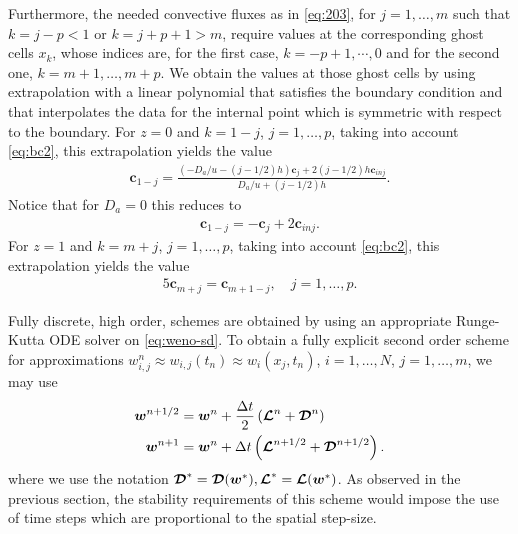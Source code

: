 \documentclass[preprint]{elsarticle}
\theoremstyle{definition}
\newcommand{\bw}{\boldsymbol w}
\newcommand{\bc}{\boldsymbol c}
\def\boc#1{\boldsymbol{{\cal #1}}}
\def\mD{\boc{D}}
\begin{document}
Furthermore, the needed convective fluxes as in \eqref{eq:203}, for
$j=1,\dots,m$ such that $k=j-p<1$ or $k=j+p+1 > m$, require values at the
corresponding ghost cells $x_k$, whose indices are, for the first case,
$k=-p+1,\cdots,0$ 
and for the second one, $k=m+1,\dots,m+p$. We  obtain the values at
those ghost cells by using  extrapolation with a linear polynomial
that satisfies the boundary condition and that interpolates the data 
for the internal point which is symmetric with respect to the
boundary. For $z=0$ and $k=1-j$, $j=1,\dots,p$, taking into account
\eqref{eq:bc2}, this extrapolation yields the value
\begin{align*}
  \bc_{1-j}=\frac{(-D_a/u-(j-1/2)h)\bc_j+2(j-1/2)h \bc_{inj}
  }{D_a/u+(j-1/2)h}.
\end{align*}
Notice that for $D_a=0$ this reduces to 
\begin{align*}
  \bc_{1-j}=-\bc_j+2\bc_{inj}.
\end{align*}
For $z=1$ and $k=m+j$, $j=1,\dots,p$, taking into account
\eqref{eq:bc2}, this extrapolation yields the value
\begin{align*}5\label{eq:bc22}
  \bc_{m+j}= \bc_{m+1-j},\quad  j=1,\dots,p.
\end{align*}



Fully discrete, high order, schemes are obtained by using an
appropriate Runge-Kutta ODE solver on \eqref{eq:weno-sd}.  To obtain
a fully explicit second order  scheme for approximations
$w^{n}_{i,j}\approx w_{i,j}(t_n)\approx w_i(x_j, t_n)$,
  $i=1,\dots,N$, $j=1,\dots,m$, we may use 
  \begin{equation} \label{eq:RK2-exp_old}
    \begin{aligned}
\boldsymbol{w}^{n+1/2}&=\boldsymbol{w}^n+\frac{\Delta t}{2}
\left(\boldsymbol{{\cal L}}^n+\boldsymbol{{\mD}}^{n} \right) \\
\boldsymbol{w}^{n+1}&=\boldsymbol{{w}}^n+\Delta t
\left(\boldsymbol{{\cal L}}^{n+1/2}+\boldsymbol{{\mD}}^{n+1/2}
\right).
\end{aligned}
\end{equation}
where 
we use the notation $\mD^*=\mD(\bw^*), \boc{L}^*=\boc{L}(\bw^*)$.
As observed in the previous section, the stability requirements of
this scheme would impose the use of time steps which are proportional
to the spatial step-size.
\end{document}

